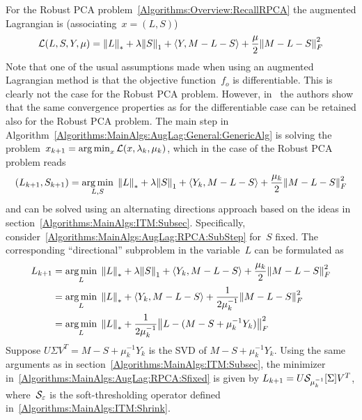 \documentclass{../../common/projectreport}
\begin{document}
For the Robust PCA problem~\eqref{Algorithms:Overview:RecallRPCA} the augmented Lagrangian is (associating~$x = (L,S)$)
%
\begin{align}
{\mathcal{L}}(L,S,Y,\mu) = {\left\|L\right\|}_{*}^{} + \lambda {\left\|S\right\|}_{1}^{} + \langle Y, M-L-S \rangle + \frac{\mu}{2} {\left\|M-L-S\right\|}_{F}^{2}
\label{Algorithms:MainAlgs:AugLag:RPCA:AugLagr}
\end{align}
%
Note that one of the usual assumptions made when using an augmented Lagrangian method is that the objective function~$f_o$ is differentiable. This is clearly not the case for the Robust PCA problem. However, in~\cite{Lin:2010fk} the authors show that the same convergence properties as for the differentiable case can be retained also for the Robust PCA problem. The main step in Algorithm~\ref{Algorithms:MainAlgs:AugLag:General:GenericAlg} is solving the problem~$x_{k+1} = \operatorname*{arg\,min}_x {\mathcal{L}}(x,\lambda_k,\mu_k)$, which in the case of the Robust PCA problem reads
%
\begin{align}
(L_{k+1},S_{k+1}) = \operatorname*{arg\,min}_{L,S} \; {\left\|L\right\|}_{*}^{} + \lambda {\left\|S\right\|}_{1}^{} + \langle Y_k, M-L-S \rangle + \frac{\mu_k}{2} {\left\|M-L-S\right\|}_{F}^{2}
\label{Algorithms:MainAlgs:AugLag:RPCA:SubStep}
\end{align}
%
and can be solved using an alternating directions approach based on the ideas in section~\ref{Algorithms:MainAlgs:ITM:Subsec}. Specifically, consider~\eqref{Algorithms:MainAlgs:AugLag:RPCA:SubStep} for~$S$ fixed. The corresponding ``directional'' subproblem in the variable~$L$ can be formulated as
%
\begin{align}
\begin{split}
L_{k+1} &= \operatorname*{arg\,min}_{L} \; {\left\|L\right\|}_{*}^{} + \lambda {\left\|S\right\|}_{1}^{} + \langle Y_k, M-L-S \rangle + \frac{\mu_k}{2} {\left\|M-L-S\right\|}_{F}^{2} \\
&= \operatorname*{arg\,min}_{L} \; {\left\|L\right\|}_{*}^{} + \langle Y_k, M-L-S \rangle + \frac{1}{2\mu_k^{-1}} {\left\|M-L-S\right\|}_{F}^{2} \\
&= \operatorname*{arg\,min}_{L} \; {\left\|L\right\|}_{*}^{} + \frac{1}{2\mu_k^{-1}} {\left\|L-(M-S+\mu_k^{-1}Y_k)\right\|}_{F}^{2} 
\end{split}
\label{Algorithms:MainAlgs:AugLag:RPCA:Sfixed}
\end{align}
%
Suppose $U\Sigma V^T = M-S+\mu_k^{-1}Y_k$ is the SVD of $M-S+\mu_k^{-1}Y_k$. Using the same arguments as in section~\ref{Algorithms:MainAlgs:ITM:Subsec}, the minimizer in~\eqref{Algorithms:MainAlgs:AugLag:RPCA:Sfixed} is given by $L_{k+1} = U {\mathcal{S}}_{\mu_k^{-1}}[\Sigma] V^T$, where~${\mathcal{S}}_\varepsilon$ is the soft-thresholding operator defined in~\eqref{Algorithms:MainAlgs:ITM:Shrink}. 
\end{document}
